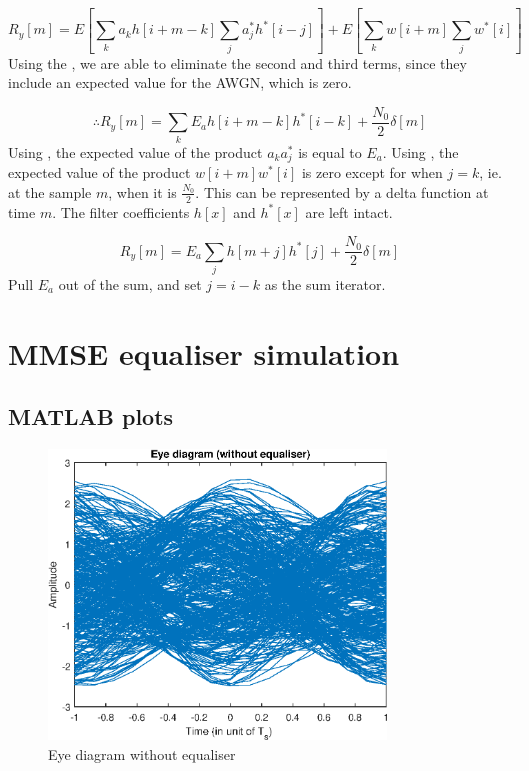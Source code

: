 \documentclass[11pt]{article}
\begin{document}
\begin{equation}
    R_y[m] = E\left[ \sum_k a_k h[i+m-k] \sum_j a_j^* h^*[i-j] \right] + E\left[
        \sum_k w[i+m] \sum_j w^*[i] \right]
\end{equation}
Using the , we are able to eliminate the second and third
terms, since they include an expected value for the AWGN, which is zero.

\begin{equation}
    \therefore R_y[m] = \sum_k E_a h[i+m-k]h^*[i-k]+\frac{N_0}{2}\delta[m]
\end{equation}
Using , the expected value of the product $a_k a_j^*$ is equal
to $E_a$. Using , the expected value of the product $w[i+m]w^*[i]$
is zero except for when $j = k$, ie.  at the sample $m$, when it is
$\frac{N_0}{2}$. This can be represented by a delta function at time $m$. The
filter coefficients $h[x]$ and $h^*[x]$ are left intact.

\begin{equation}
    R_y[m] = E_a \sum_j h[m+j]h^*[j]+\frac{N_0}{2}\delta[m]
\end{equation}
Pull $E_a$ out of the sum, and set $j = i - k$ as the sum iterator.

\section{MMSE equaliser simulation}

\subsection{MATLAB plots}
\begin{figure}[H]
    \centering
    \includegraphics[width=0.8\textwidth]{plots/multipath_eye.eps}
    \caption{Eye diagram without equaliser\label{badeye}}
\end{figure}
\end{document}
